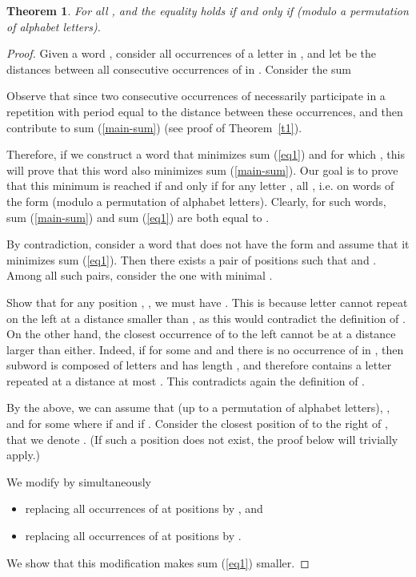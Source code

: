 \documentclass[11pt]{article}
\newtheorem{theorem}{Theorem}
\begin{document}
\begin{theorem}
\label{t3}
For all ,  and
the equality holds
if and only if  (modulo a
permutation of alphabet letters). 
\end{theorem}
\begin{proof}
Given a word , consider all occurrences of a letter
 in , and let 
be the distances between all consecutive occurrences of  in
. Consider the sum 

Observe that  since two consecutive
occurrences of  necessarily participate in a repetition with 
period equal to the distance between these occurrences, and then
contribute to sum (\ref{main-sum}) (see proof of Theorem~\ref{t1}). 

Therefore, if we
construct a word that minimizes sum (\ref{eq1}) and for which
, this will prove that this
word also minimizes 
sum (\ref{main-sum}). 
Our goal is to prove that this minimum is reached if and only if for
any letter , all , i.e. on words of the form
 (modulo a 
permutation of alphabet letters). Clearly, for such words, sum
(\ref{main-sum}) and sum (\ref{eq1}) are both equal to
. 

By contradiction, consider a word  that does not have the form
 and assume that it
minimizes sum (\ref{eq1}). 
Then there exists a pair of positions  such that
 and . Among all such pairs,
consider the one with minimal . 


Show that for any position , , we must have
. This is because letter  cannot repeat on the left
at a distance smaller than , as this would contradict the
definition of . On the other hand, the closest occurrence of
 to the left cannot be at a distance larger than 
either. Indeed, if  for some  and  and there
is no occurrence of  in , then  subword
 is composed of  letters and has length , and
therefore contains a letter repeated at a distance at most . This
contradicts again the definition of . 

By the above, we can assume that 
 (up to a permutation of alphabet
letters), , and 
 for some
 where  if  and  if . 
Consider the
closest position of  to the right of , that we denote
. (If such a position does not exist, the proof below will
trivially apply.) 

We modify  by simultaneously
\begin{itemize}
\item replacing all occurrences of  at positions  by
  , and
\item replacing all occurrences of  at positions  by
  .
\end{itemize}
We show that this modification makes sum (\ref{eq1}) smaller. 



\end{proof}
\end{document}
